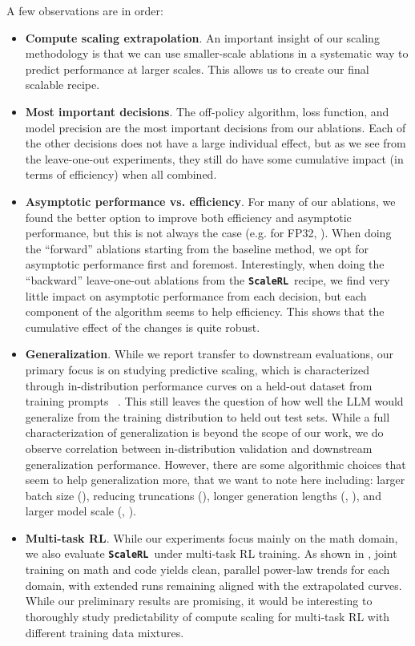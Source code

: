 \documentclass[]{fairmeta} %
\newcommand{\scalerl}{\texttt{\textbf{ScaleRL}}}
\begin{document}
A few observations are in order:
\begin{itemize}
    \item \textbf{Compute scaling extrapolation}. An important insight of our scaling methodology is that we can use smaller-scale ablations in a systematic way to predict performance at larger scales. This allows us to create our final scalable recipe.
    \item \textbf{Most important decisions}. The off-policy algorithm, loss function, and model precision are the most important decisions from our ablations. Each of the other decisions does not have a large individual effect, but as we see from the leave-one-out experiments, they still do have some cumulative impact (in terms of efficiency) when all combined. 
    \item \textbf{Asymptotic performance vs. efficiency}. For many of our ablations, we found the better option to improve both efficiency and asymptotic performance, but this is not always the case (e.g. for FP32, ). When doing the ``forward'' ablations starting from the baseline method, we opt for asymptotic performance first and foremost. Interestingly, when doing the ``backward'' leave-one-out ablations from the \scalerl\ recipe, we find very little impact on asymptotic performance from each decision, but each component of the algorithm seems to help efficiency. This shows that the cumulative effect of the changes is quite robust.
    \item \textbf{Generalization}. While we report transfer to downstream evaluations, our primary focus is on studying predictive scaling, which is characterized through in-distribution performance curves on a held-out dataset from training prompts ~\citep{misfitting,scalingdataconstrained}.    
    This still leaves the question of how well the LLM would generalize from the training distribution to held out test sets. %
    While a full characterization of generalization is beyond the scope of our work, we do observe correlation between in-distribution validation and downstream generalization performance. However, there are some algorithmic choices that seem to help generalization more, that we want to note here including: larger batch size (), reducing truncations (), longer generation lengths (, ), and larger model scale (, ).

\item \textbf{Multi-task RL}. While our  experiments focus mainly on the math domain, we also evaluate \scalerl\ under multi-task RL training. As shown in , joint training on math and code yields clean, parallel power-law trends for each domain, with extended runs remaining aligned with the extrapolated curves. While our preliminary results are promising, it would be interesting to thoroughly study predictability of compute scaling for multi-task RL with different training data mixtures.
\end{itemize}
\end{document}
